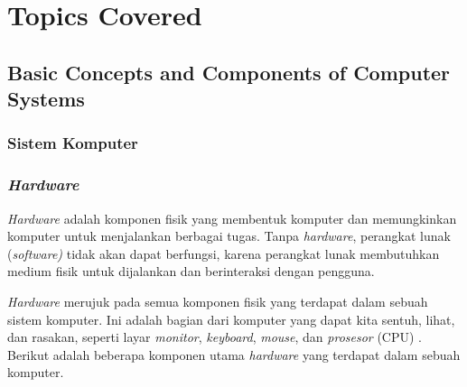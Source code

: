 \documentclass[12pt]{article}
\begin{document}
\section{Topics Covered}

\subsection{Basic Concepts and Components of Computer Systems}

    \subsubsection{Sistem Komputer}
    \subsubsection{\textit{Hardware}}
    
    \hspace{0.61cm}\textit{Hardware} adalah komponen fisik yang membentuk komputer dan memungkinkan komputer untuk menjalankan berbagai tugas. Tanpa \textit{hardware}, perangkat lunak (\textit{software)} tidak akan dapat berfungsi, karena perangkat lunak membutuhkan medium fisik untuk dijalankan dan berinteraksi dengan pengguna.
    
   \hspace{0.61cm}\textit{ Hardware} merujuk pada semua komponen fisik yang terdapat dalam sebuah sistem komputer. Ini adalah bagian dari komputer yang dapat kita sentuh, lihat, dan rasakan, seperti layar \textit{monitor}, \textit{keyboard}, \textit{mouse}, dan \textit{prosesor} (CPU) . Berikut adalah beberapa komponen utama \textit{hardware} yang terdapat dalam sebuah komputer.
   
\end{document}

